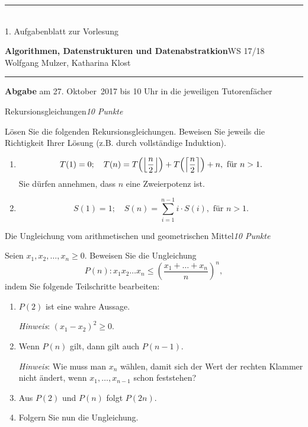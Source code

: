 \documentclass[a4paper,twoside,12pt]{article}
\newcommand{\ZETTELNUMMER}{1}
\newcommand{\ABGABEDATUM}{am 27. Oktober~2017 bis 10 Uhr in die 
  jeweiligen Tutorenf\"acher}
\newcounter{AUFGNR}
\newcommand{\AUFGABE}[2]{\vspace{0.3cm}\item[Aufgabe \arabic{AUFGNR}]\stepcounter{AUFGNR} #1\hfill\emph{#2}}
\begin{document}
\pagestyle{empty}
\hrule\medskip
\rule{0ex}{0ex}\\[-1ex]
\ZETTELNUMMER. Aufgabenblatt zur Vorlesung

\smallskip
\noindent
\large
\textbf{Algorithmen, Datenstrukturen und Datenabstratkion}\hfill WS 17/18 \\[0.5ex]
\normalsize
Wolfgang Mulzer, Katharina Klost

\medskip\hrule

\smallskip
\noindent
\textbf{Abgabe} \ABGABEDATUM

\vskip 0.5cm

\begin{description}

\AUFGABE{Rekursionsgleichungen}{10 Punkte}

L\"osen Sie die folgenden Rekursionsgleichungen.
Beweisen Sie jeweils die Richtigkeit Ihrer L\"osung
(z.B. durch vollst\"andige Induktion).
\begin{enumerate}
  \item
    \[
       T(1) = 0; \quad T(n) = 
       T\Bigl(\left\lfloor \frac{n}{2}\right\rfloor\Bigr) +
                 T\Bigl(\left\lceil \frac{n}{2} \right\rceil\Bigr) + n, 
		 \text{ f\"ur } n > 1.
    \]
    Sie d\"urfen annehmen, dass $n$ eine Zweierpotenz ist.
  \item 
    \[
      S(1) = 1; \quad S(n) = \sum_{i=1}^{n-1} i \cdot S(i), 
        \text{ f\"ur } n > 1.
    \]
\end{enumerate}


\AUFGABE{Die Ungleichung vom arithmetischen und geometrischen Mittel}{10 Punkte}


Seien $x_1, x_2, \ldots, x_n \geq 0$. Beweisen Sie
die Ungleichung
\[
P(n): x_1 x_2 \ldots x_n
\leq\left(\frac{x_1+\dots+x_n}{n}\right)^n,
\]
indem Sie folgende Teilschritte bearbeiten:
\begin{enumerate}
  \item $P(2)$ ist eine wahre Aussage.

     \emph{Hinweis}: $(x_1 - x_2)^2 \geq 0$.
  \item
     Wenn $P(n)$ gilt, dann gilt auch $P(n-1)$.

     \emph{Hinweis}: Wie muss man $x_n$ w\"ahlen, damit 
     sich der Wert der rechten Klammer nicht \"andert, wenn
     $x_1, \ldots, x_{n-1}$ schon feststehen?

   \item Aus $P(2)$ und $P(n)$ folgt $P(2n)$.
   \item Folgern Sie nun die Ungleichung. 
\end{enumerate}


\end{description}
\end{document}
